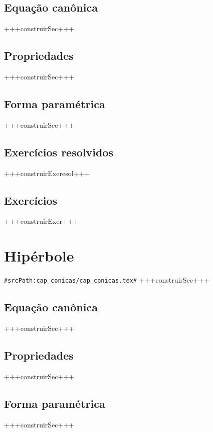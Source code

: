 \subsection{Equação canônica}
+++construirSec+++

\subsection{Propriedades}
+++construirSec+++

\subsection{Forma paramétrica}
+++construirSec+++

\subsection*{Exercícios resolvidos}
+++construirExeresol+++

\subsection*{Exercícios}
+++construirExer+++



\section{Hipérbole}
\verb+#srcPath:cap_conicas/cap_conicas.tex#+
+++construirSec+++

\subsection{Equação canônica}
+++construirSec+++

\subsection{Propriedades}
+++construirSec+++

\subsection{Forma paramétrica}
+++construirSec+++

